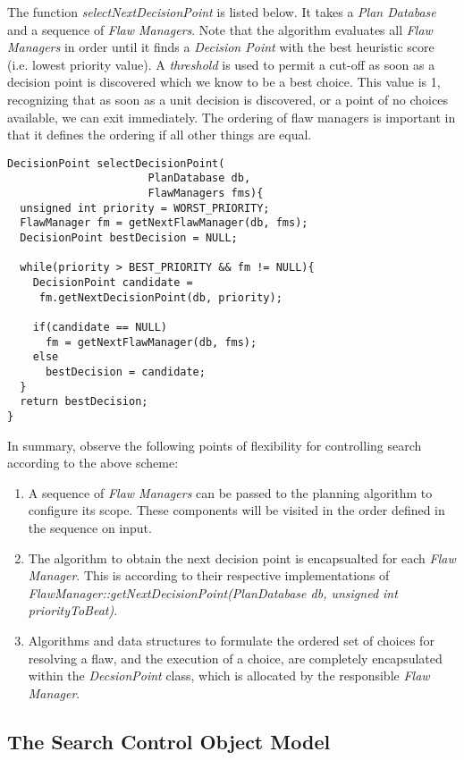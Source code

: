 \documentclass[10pt, letterpaper, oneside]{article}
\begin{document}
The function {\em selectNextDecisionPoint} is listed below. It takes a {\em Plan Database} and a sequence of {\em Flaw Managers}. Note that the algorithm evaluates all {\em Flaw Managers} in order until it finds a {\em Decision Point} with the best heuristic score (i.e. lowest priority value). A {\em threshold} is used to permit a cut-off as soon as a decision point is discovered which we know to be a best choice. This value is 1, recognizing that as soon as a unit decision is discovered, or a point of no choices available, we can exit immediately. The ordering of flaw managers is important in that it defines the ordering if all other things are equal.
\begin{verbatim}
DecisionPoint selectDecisionPoint(
                      PlanDatabase db, 
                      FlawManagers fms){
  unsigned int priority = WORST_PRIORITY;
  FlawManager fm = getNextFlawManager(db, fms);
  DecisionPoint bestDecision = NULL;

  while(priority > BEST_PRIORITY && fm != NULL){
    DecisionPoint candidate = 
     fm.getNextDecisionPoint(db, priority);

    if(candidate == NULL)
      fm = getNextFlawManager(db, fms);
    else
      bestDecision = candidate;
  }
  return bestDecision;
}
\end{verbatim}

In summary, observe the following points of flexibility for controlling search according to the above scheme:
\begin{enumerate}
\item A sequence of {\em Flaw Managers} can be passed to the planning algorithm to configure its scope. These components will be visited in the order defined in the sequence on input.
\item The algorithm to obtain the next decision point is encapsualted for each {\em Flaw Manager}. This is according to their respective implementations of {\em FlawManager::getNextDecisionPoint(PlanDatabase db, unsigned int priorityToBeat)}.
\item Algorithms and data structures to formulate the ordered set of choices for resolving a flaw, and the execution of a choice, are completely encapsulated within the {\em DecsionPoint} class, which is allocated by the responsible {\em Flaw Manager}.
\end{enumerate}

\subsection{The Search Control Object Model}
\end{document}
